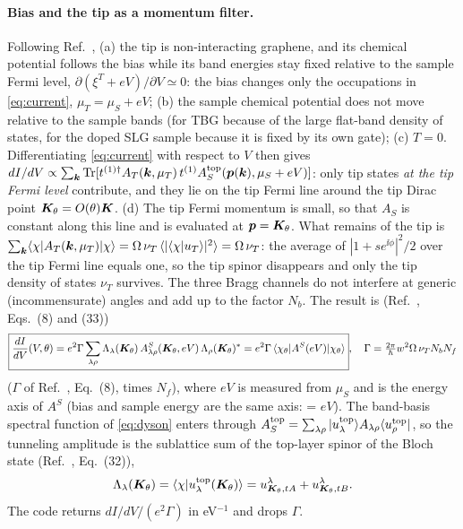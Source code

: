 \paragraph{Bias and the tip as a momentum filter.} Following Ref.~\cite{Wei2025}, (a) the tip is non-interacting
graphene, and its chemical potential follows the bias while its band energies stay fixed relative to the sample
Fermi level, $\partial(\xi^T+eV)/\partial V\simeq0$: the bias changes only the occupations in \cref{eq:current},
$\mu_T=\mu_S+eV$; (b) the sample chemical potential does not move relative to the sample bands (for TBG because
of the large flat-band density of states, for the doped SLG sample because it is fixed by its own gate);
(c) $T=0$. Differentiating \cref{eq:current} with respect to $V$ then gives
$dI/dV\propto\sum_{\bm k}\operatorname{Tr}[t^{(1)\dagger}A_T(\bm k,\mu_T)\,t^{(1)}A^{\rm top}_S(\bm p(\bm k),\mu_S+eV)]$: only tip states \emph{at the
tip Fermi level} contribute, and they lie on the tip Fermi line around the tip Dirac point
$\bm K_\theta=O(\theta)\bm K$. (d) The tip Fermi momentum is small, so that $A_S$ is constant along this line and is
evaluated at $\bm p=\bm K_\theta$. What remains of the tip is
$\sum_{\bm k}\langle \chi| A_T(\bm k,\mu_T)|\chi\rangle=\Omega\,\nu_T\,\langle|\langle \chi|u_T\rangle|^2\rangle=\Omega\,\nu_T$: the average of
$|1+se^{\ii\phi}|^2/2$ over the tip Fermi line equals one, so the tip spinor disappears and only the tip density of
states $\nu_T$ survives. The three Bragg channels do not interfere at generic (incommensurate) angles and add up
to the factor $N_b$. The result is (Ref.~\cite{Wei2025}, Eqs.~(8) and (33))
\begin{equation}
\boxed{\frac{dI}{dV}(V,\theta)=e^2\Gamma\sum_{\lambda\rho}\Lambda_\lambda(\bm K_\theta)\,
A^S_{\lambda\rho}(\bm K_\theta,eV)\,\Lambda_\rho(\bm K_\theta)^*
=e^2\Gamma\,\langle \chi_\theta|A^S(eV)|\chi_\theta\rangle},
\quad \Gamma=\tfrac{2\pi}{\hbar}w^2\Omega\,\nu_TN_bN_f
\label{eq:didv}
\end{equation}
($\Gamma$ of Ref.~\cite{Wei2025}, Eq.~(8), times $N_f$), where $eV$ is measured from $\mu_S$ and is the energy axis of $A^S$ (bias and
sample energy are the same axis:  = $eV$). The band-basis spectral function of
\cref{eq:dyson} enters through $A^{\rm top}_S=\sum_{\lambda\rho}|u^{\rm top}_\lambda\rangle A_{\lambda\rho}\langle u^{\rm top}_\rho|$,
so the tunneling amplitude is the sublattice sum of the top-layer spinor of the Bloch state (Ref.~\cite{Wei2025}, Eq.~(32)),
\begin{equation}
\Lambda_\lambda(\bm K_\theta)=\langle \chi|u^{\rm top}_{\lambda}(\bm K_\theta)\rangle=u^\lambda_{\bm K_\theta,tA}+u^\lambda_{\bm K_\theta,tB}.
\label{eq:Lambda}
\end{equation}
The code returns $dI/dV/(e^2\Gamma)$ in eV$^{-1}$ and drops $\Gamma$.

